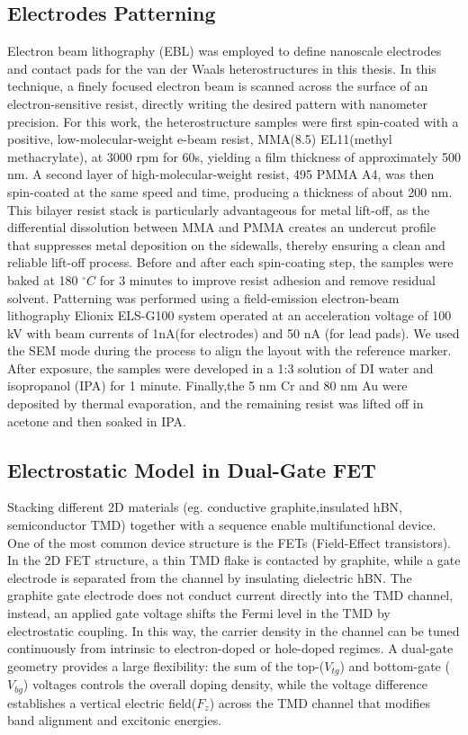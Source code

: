 \subsection{Electrodes Patterning}
\label{sec:Electrodes Patterning}
Electron beam lithography (EBL) was employed to define nanoscale electrodes and contact pads for the van der Waals heterostructures in this thesis. 
In this technique, a finely focused electron beam is scanned across the surface of an electron-sensitive resist, directly writing the desired pattern with nanometer precision. 
For this work, the heterostructure samples were first spin-coated with a positive, low-molecular-weight e-beam resist, MMA(8.5) EL11(methyl methacrylate), at 3000 rpm for 60s, yielding a film thickness of approximately 500 nm. 
A second layer of high-molecular-weight resist, 495 PMMA A4, was then spin-coated at the same speed and time, producing a thickness of about 200 nm. 
This bilayer resist stack is particularly advantageous for metal lift-off, as the differential dissolution between MMA and PMMA creates an undercut profile that suppresses metal deposition on the sidewalls, thereby ensuring a clean and reliable lift-off process.
Before and after each spin-coating step, the samples were baked at 180 $^{\circ}C$ for 3 minutes to improve resist adhesion and remove residual solvent.
Patterning was performed using a field-emission electron-beam lithography Elionix ELS-G100 system operated at an acceleration voltage of 100 kV with beam currents of 1nA(for electrodes) and 50 nA (for lead pads). 
We used the SEM mode during the process to align the layout with the reference marker.
After exposure, the samples were developed in a 1:3 solution of DI water and isopropanol (IPA) for 1 minute.
Finally,the 5 nm Cr and 80 nm Au were deposited by thermal evaporation, and the remaining resist was lifted off in acetone and then soaked in IPA.

\subsection{Electrostatic Model in Dual-Gate FET}
\label{Electrostatic Model in Dual-gate FET}
Stacking different 2D materials (eg. conductive graphite,insulated hBN, semiconductor TMD) together with a sequence enable multifunctional device. One of the most common device structure is the FETs (Field-Effect transistors).
In the 2D FET structure, a thin TMD flake is contacted by graphite, while a gate electrode is separated from the channel by insulating dielectric hBN. 
The graphite gate electrode does not conduct current directly into the TMD channel, instead, an applied gate voltage shifts the Fermi level in the TMD by electrostatic coupling. 
In this way, the carrier density in the channel can be tuned continuously from intrinsic to electron-doped or hole-doped regimes. 
A dual-gate geometry provides a large flexibility: the sum of the top-($V_{tg}$) and bottom-gate ($V_{bg}$) voltages controls the overall doping density, while the voltage difference establishes a vertical electric field($F_z$) across the TMD channel that modifies band alignment and excitonic energies.

